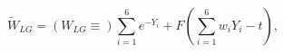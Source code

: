 \begin{equation}
\label{eq:WLG1}
\tilde{W}_{LG}=(W_{LG}\equiv)\sum_{i=1}^6e^{-Y_i}+F(\sum_{i=1}^6w_iY_i - t),
\end{equation}

